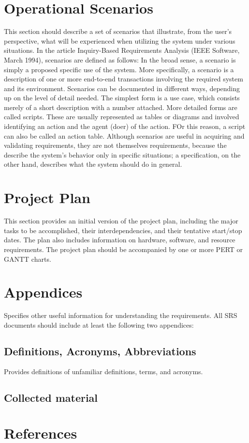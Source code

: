\documentclass[]{article}
\begin{document}
\section{Operational Scenarios}
This section should describe a set of scenarios that illustrate, from the user's perspective, what will be experienced when utilizing the system under various situations. 
In the article Inquiry-Based Requirements Analysis (IEEE Software, March 1994), scenarios are defined as follows: 
In the broad sense, a scenario is simply a proposed specific use of the system. More specifically, a scenario is a description of one or more end-to-end transactions involving the required system and its environment. Scenarios can be documented in different ways, depending up on the level of detail needed. The simplest form is a use case, which consists merely of a short description with a number attached. More detailed forms are called scripts. These are usually represented as tables or diagrams and involved identifying an action and the agent (doer) of the action. FOr this reason, a script can also be called an action table. 
Although scenarios are useful in acquiring and validating requirements, they are not themselves requirements, because the describe the system's behavior only in specific situations; a specification, on the other hand, describes what the system should do in general. 

\section{Project Plan}
This section provides an initial version of the project plan, including the major tasks to be accomplished, their interdependencies, and their tentative start/stop dates. The plan also includes information on hardware, software, and  resource requirements. 
The project plan should be accompanied by one or more PERT or GANTT charts. 

\section{Appendices}
Specifies other useful information for understanding the requirements. All SRS documents should include at least the following two appendices: 

\subsection{Definitions, Acronyms, Abbreviations}
Provides definitions of unfamiliar definitions, terms, and acronyms. 

\subsection{Collected material}

\section {References}




\end{document}
